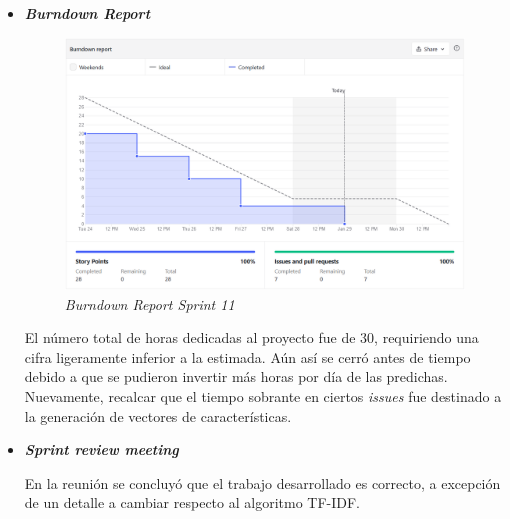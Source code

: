 \begin{itemize}
	\item \textbf{\textit{Burndown Report}}
	\begin{figure}[h]
		\caption{\textit{Burndown Report Sprint 11}}
		\centering
		\includegraphics[width=\textwidth]{../img/anexos/bdr/s11_bdr}
	\end{figure}
	
	El número total de horas dedicadas al proyecto fue de $30$, requiriendo una cifra ligeramente inferior a la estimada. Aún así se cerró antes de tiempo debido a que se pudieron invertir más horas por día de las predichas. Nuevamente, recalcar que el tiempo sobrante en ciertos \textit{issues} fue destinado a la generación de vectores de características.
	
	\item \textbf{\textit{Sprint review meeting}}
	
	En la reunión se concluyó que el trabajo desarrollado es correcto, a excepción de un detalle a cambiar respecto al algoritmo TF-IDF.
	
\end{itemize}
